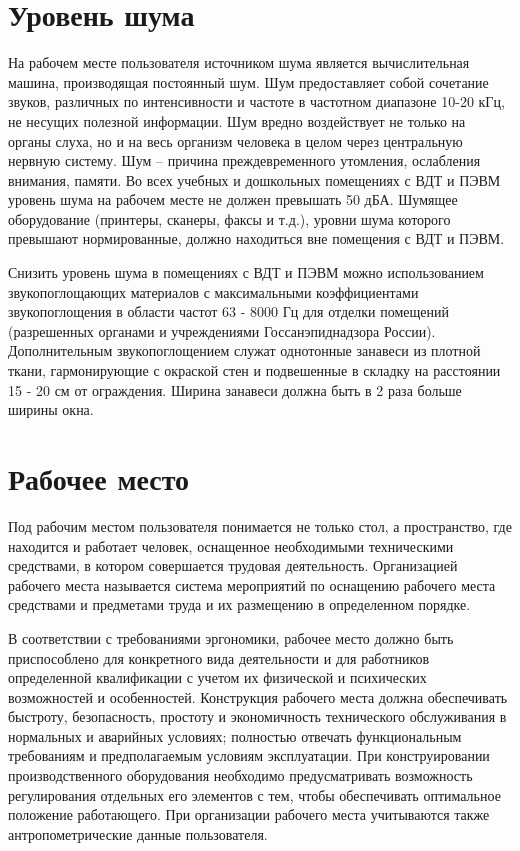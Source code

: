 \documentclass[12pt,a4paper]{report}
\begin{document}
\section{Уровень шума}
На рабочем месте пользователя источником шума является вычислительная машина, производящая постоянный шум. Шум предоставляет собой сочетание звуков, различных по интенсивности и частоте в частотном диапазоне 10-20 кГц, не несущих полезной информации. Шум вредно воздействует не только на органы слуха, но и на весь организм человека в целом через центральную нервную систему. Шум – причина преждевременного утомления, ослабления внимания, памяти. Во всех учебных и дошкольных помещениях с ВДТ и ПЭВМ уровень шума на рабочем месте не должен превышать 50 дБА. Шумящее оборудование (принтеры, сканеры, факсы и т.д.), уровни шума которого превышают нормированные, должно находиться вне помещения с ВДТ и ПЭВМ. 

Снизить уровень шума в помещениях с ВДТ и ПЭВМ можно использованием звукопоглощающих материалов с максимальными коэффициентами звукопоглощения в области частот 63 - 8000 Гц для отделки помещений (разрешенных органами и учреждениями Госсанэпиднадзора России). Дополнительным звукопоглощением служат однотонные занавеси из плотной ткани, гармонирующие с окраской стен и подвешенные в складку на расстоянии 15 - 20 см от ограждения. Ширина занавеси должна быть в 2 раза больше ширины окна.

\section{Рабочее место}
Под рабочим местом пользователя понимается не только стол, а пространство, где находится и работает человек, оснащенное необходимыми техническими средствами, в котором совершается трудовая деятельность. Организацией рабочего места называется система мероприятий по оснащению рабочего места средствами и предметами труда и их размещению в определенном порядке. 

В соответствии с требованиями эргономики, рабочее место должно быть приспособлено для конкретного вида деятельности и для работников определенной квалификации с учетом их физической и психических возможностей и особенностей. Конструкция рабочего места должна обеспечивать быстроту, безопасность, простоту и экономичность технического обслуживания в нормальных и аварийных условиях; полностью отвечать функциональным требованиям и предполагаемым условиям эксплуатации. При конструировании производственного оборудования необходимо предусматривать возможность регулирования отдельных его элементов с тем, чтобы обеспечивать оптимальное положение работающего. При организации рабочего места учитываются также антропометрические данные пользователя.
\end{document}
